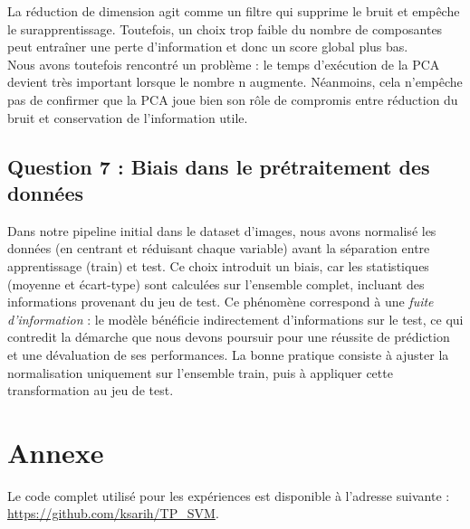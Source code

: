 \documentclass[12pt]{article}
\begin{document}
La réduction de dimension agit comme un filtre qui supprime le bruit 
et empêche le surapprentissage. Toutefois, un choix trop faible du 
nombre de composantes peut entraîner une perte d’information 
et donc un score global plus bas.\\
Nous avons toutefois rencontré un problème : le temps d’exécution de la PCA devient très important lorsque le nombre n augmente. Néanmoins, cela n’empêche pas de confirmer que la PCA joue bien son rôle de compromis entre réduction du bruit et conservation de l’information utile.

\subsection{Question 7 : Biais dans le prétraitement des données}

Dans notre pipeline initial dans le dataset d'images, nous avons normalisé les données (en centrant et réduisant chaque variable) avant la séparation 
entre apprentissage (train) et test. Ce choix introduit un biais, car 
les statistiques (moyenne et écart-type) sont calculées sur 
l’ensemble complet, incluant des informations provenant du jeu 
de test.
Ce phénomène correspond à une \textit{fuite d’information} : le modèle bénéficie indirectement 
d’informations sur le test, ce qui contredit la démarche que nous devons poursuir pour une réussite de prédiction et une dévaluation de ses 
performances.
La bonne pratique consiste à ajuster la normalisation uniquement 
sur l’ensemble train, puis à appliquer cette transformation au jeu de test.
\newpage
\appendix
\section*{Annexe}
Le code complet utilisé pour les expériences est disponible à l’adresse suivante : \\
\href{https://github.com/ksarih/TP_SVM}{https://github.com/ksarih/TP\_SVM}.
\end{document}
